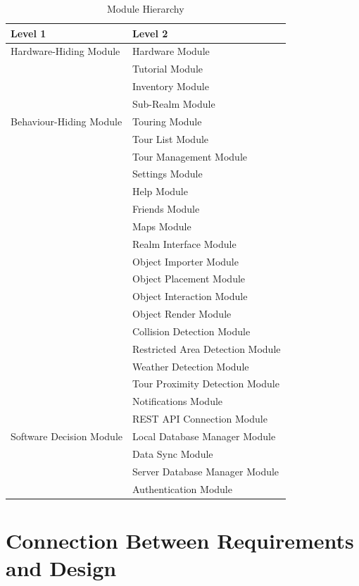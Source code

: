 \documentclass[12pt, titlepage]{article}
\begin{document}
\begin{table}[h!]
\centering
\begin{tabular}{p{} p{}}
\toprule
\textbf{Level 1} & \textbf{Level 2}\\
\midrule

{Hardware-Hiding Module} & Hardware Module\\
\midrule

\multirow{7}{0.3\textwidth}{Behaviour-Hiding Module} & Tutorial Module\\
& Inventory Module\\
& Sub-Realm Module\\
& Touring Module\\
& Tour List Module\\
& Tour Management Module\\
& Settings Module\\
& Help Module\\
& Friends Module\\ 
& Maps Module\\
& Realm Interface Module\\
& Object Importer Module\\
& Object Placement Module\\
& Object Interaction Module\\
& Object Render Module\\
& Collision Detection Module\\
& Restricted Area Detection Module\\
& Weather Detection Module\\
& Tour Proximity Detection Module\\
& Notifications Module\\
\midrule

\multirow{3}{0.3\textwidth}{Software Decision Module} & REST API Connection Module\\
& Local Database Manager Module\\
& Data Sync Module\\
& Server Database Manager Module\\
& Authentication Module\\
\bottomrule

\end{tabular}
\caption{Module Hierarchy}
\label{TblMH}
\end{table}

\newpage

\section{Connection Between Requirements and Design} \label{SecConnection}
\end{document}
